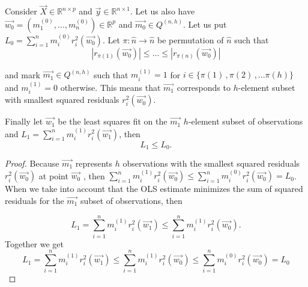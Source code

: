 
\begin{theorem}
Consider 
$\vec{X} \in \mathbb{R}^{n \times p}$ and 
$\vec{y} \in \mathbb{R}^{n \times 1}$.  
Let us also have $\vec{w_0} = (m^{(0)}_1, \ldots, m^{(0)}_n)\in\mathbb{R}^p$ and $\vec{m_0} \in Q^{(n,h)}$. 
Let us put $L_0 = \sum\limits_{i=1}^n m^{(0)}_i r_{i}^2(\vec{w_0})$.
Let $\pi: \hat{n} \rightarrow \hat{n}$ be permutation of $\hat{n}$ such that 
\begin{equation}
    |r_{\pi(1)}(\vec{w_0})| \leq \ldots \leq |r_{\pi(n)}(\vec{w_0})|    
\end{equation}

and mark   $\vec{m_1} \in Q^{(n,h)}$  such that $m^{(1)}_i = 1$ for $i \in \{{\pi(1)\,, \pi(2)\,,... \pi(h)\}}$ and  $m^{(1)}_i = 0$  otherwise. 
This means that  $\vec{m_1}$ corresponds to $h$-element subset with smallest squared residuals $r_{i}^2(\vec{w_0})$.

Finally let $\vec{w_1}$ be the least squares fit on the $\vec{m_1}$ $h$-element subset of observations and $L_1 = \sum\limits_{i=1}^n m^{(1)}_i r_{i}^2(\vec{w_1})$, then
\begin{equation} 
    L_1  \leq L_0.
\end{equation}
\end{theorem}

\begin{proof}
    Because $\vec{m_1}$ represents $h$ observations with the smallest squared residuals $r_{i}^2(\vec{w_0})$ at point $\vec{w_0}$ , then
$\sum\limits_{i=1}^n m^{(1)}_i r_{i}^2(\vec{w_0})
\leq
\sum\limits_{i=1}^n m^{(0)}_i r_{i}^2(\vec{w_0}) =  L_0
$.
When we take into account that the OLS estimate minimizes the sum of squared residuals for the $\vec{m_1}$ subset of observations, then  

\begin{equation}
    L_1 =  \sum\limits_{i=1}^n m^{(1)}_i r_{i}^2(\vec{w_1})
    \leq 
   \sum\limits_{i=1}^n m^{(1)}_i r_{i}^2(\vec{w_0}).    
\end{equation}
Together we get 
\begin{equation}
L_1 = \sum\limits_{i=1}^n m^{(1)}_i r_{i}^2(\vec{w_1})
\leq
\sum\limits_{i=1}^n m^{(1)}_i r_{i}^2(\vec{w_0})
\leq
\sum\limits_{i=1}^n m^{(0)}_i r_{i}^2(\vec{w_0}) =  L_0
\end{equation}
\end{proof}


